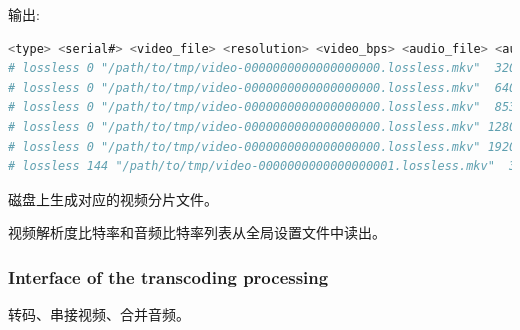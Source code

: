 \begin{enumerate}
输出:
\begin{lstlisting}[language=bash]
<type> <serial#> <video_file> <resolution> <video_bps> <audio_file> <audio_bps>
# lossless 0 "/path/to/tmp/video-0000000000000000000.lossless.mkv"  320x180   315k "/path/to/audio1.flac" 64k
# lossless 0 "/path/to/tmp/video-0000000000000000000.lossless.mkv"  640x360   705k "/path/to/audio1.flac" 64k
# lossless 0 "/path/to/tmp/video-0000000000000000000.lossless.mkv"  853x480  1200k "/path/to/audio1.flac" 192k
# lossless 0 "/path/to/tmp/video-0000000000000000000.lossless.mkv" 1280x720  3200k "/path/to/audio1.flac" 256k
# lossless 0 "/path/to/tmp/video-0000000000000000000.lossless.mkv" 1920x1080 4200k "/path/to/audio1.flac" 256k
# lossless 144 "/path/to/tmp/video-0000000000000000001.lossless.mkv"  320x180   315k "/path/to/audio1.flac" 64k
\end{lstlisting}

磁盘上生成对应的视频分片文件。

视频解析度比特率和音频比特率列表从全局设置文件中读出。
\end{enumerate}


\subsubsection{Interface of the transcoding processing}

转码、串接视频、合并音频。

